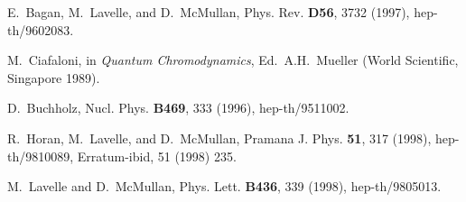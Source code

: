 \documentclass[12pt,a4paper]{article}
\begin{document}
\begin{thebibliography}{10}
E.~Bagan, M.~Lavelle, and D.~McMullan,
\newblock Phys. Rev. {\bf D56}, 3732 (1997), hep-th/9602083.

M.~Ciafaloni,
\newblock in \textit{Quantum Chromodynamics}, Ed.~A.H.~Mueller (World
  Scientific, Singapore 1989).

D.~Buchholz,
\newblock Nucl. Phys. {\bf B469}, 333 (1996), hep-th/9511002.

R.~Horan, M.~Lavelle, and D.~McMullan,
\newblock Pramana J. Phys. {\bf 51}, 317 (1998), hep-th/9810089,
\newblock Erratum-ibid, 51 (1998) 235.

M.~Lavelle and D.~McMullan,
\newblock Phys. Lett. {\bf B436}, 339 (1998), hep-th/9805013.

\end{thebibliography}




%
%
\end{document}
